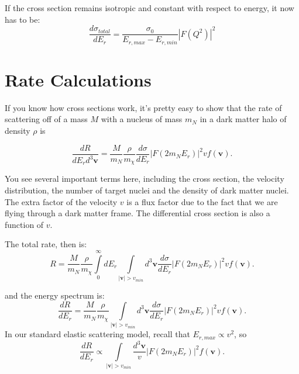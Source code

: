 \documentclass{article}
\begin{document}
If the cross section remains isotropic and constant with respect to energy, it now has to be:
\begin{equation}
\frac{d\sigma_{total}}{dE_r} = \frac{\sigma_0}{E_{r,max}-E_{r,min}} | F(Q^2) |^2
\end{equation}

\section{Rate Calculations}

If you know how cross sections work, it's pretty easy to show that the rate of scattering
off of a mass $M$ with a nucleus of mass $m_N$ in a dark matter halo of density $\rho$ is

\begin{equation}
\frac{dR}{dE_r d^3\mathbf{v}} = \frac{M}{m_N}\frac{\rho}{m_\chi}\frac{d\sigma}{dE_r}|F(2m_N E_r)|^2 vf(\mathbf{v}).
\end{equation}

You see several important terms here, including the cross section, the velocity distribution, the number of target nuclei and the density of dark matter nuclei. The extra factor of the velocity $v$ is a flux factor due to the fact that we are flying through a dark matter frame. The differential cross section is also a function of $v$.

The total rate, then is:
\begin{equation}
R = \frac{M}{m_N}\frac{\rho}{m_\chi} \int\limits_0^\infty dE_r \int\limits_{|\mathbf{v}|>v_{min}} d^3\mathbf{v} \frac{d\sigma}{dE_r}|F(2m_N E_r)|^2 vf(\mathbf{v}).
\end{equation}

and the energy spectrum is:
\begin{equation}
\frac{dR}{dE_r} = \frac{M}{m_N}\frac{\rho}{m_\chi} \int\limits_{|\mathbf{v}|>v_{min}} d^3\mathbf{v}  \frac{d\sigma}{dE_r}|F(2m_N E_r)|^2 vf(\mathbf{v}).
\end{equation}
In our standard elastic scattering model, recall that $E_{r,max}\propto v^2$, so
\begin{equation}
\frac{dR}{dE_r} \propto \int\limits_{|\mathbf{v}|>v_{min}} \frac{d^3\mathbf{v}}{v}  |F(2m_N E_r)|^2 f(\mathbf{v}).
\end{equation}
\end{document}
